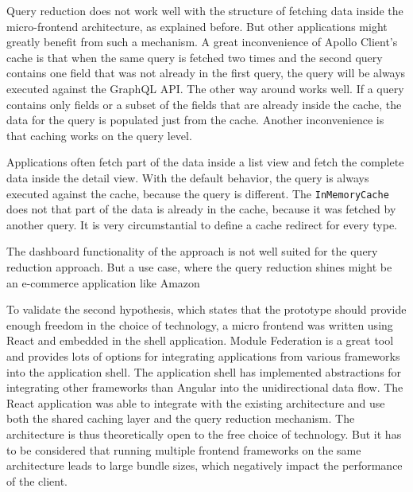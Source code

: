 \bigskip

\noindent Query reduction does not work well with the structure of fetching data inside the micro-frontend architecture, as explained before. But other applications might greatly benefit from such a mechanism. A great inconvenience of Apollo Client's cache is that when the same query is fetched two times and the second query contains one field that was not already in the first query, the query will be always executed against the GraphQL \ac{API}. The other way around works well. If a query contains only fields or a subset of the fields that are already inside the cache, the data for the query is populated just from the cache. Another inconvenience is that caching works on the query level. 

Applications often fetch part of the data inside a list view and fetch the complete data inside the detail view. With the default behavior, the query is always executed against the cache, because the query is different. The \texttt{InMemoryCache}  does not that part of the data is already in the cache, because it was fetched by another query. It is very circumstantial to define a cache redirect for every type.

The dashboard functionality of the approach is not well suited for the query reduction approach. But a use case, where the query reduction shines might be an e-commerce application like Amazon

\bigskip

\noindent To validate the second hypothesis, which states that the prototype should provide enough freedom in the choice of technology, a micro frontend was written using React and embedded in the shell application. Module Federation is a great tool and provides lots of options for integrating applications from various frameworks into the application shell. The application shell has implemented abstractions for integrating other frameworks than Angular into the unidirectional data flow. The React application was able to integrate with the existing architecture and use both the shared caching layer and the query reduction mechanism. The architecture is thus theoretically open to the free choice of technology. But it has to be considered that running multiple frontend frameworks on the same architecture leads to large bundle sizes, which negatively impact the performance of the client.
